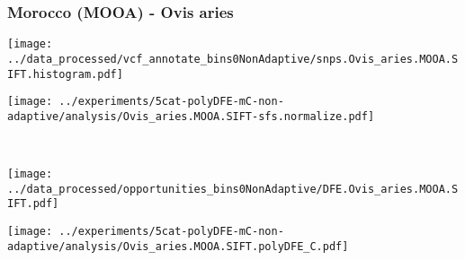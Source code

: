 \subsubsection{Morocco (MOOA) - Ovis aries}

\begin{minipage}{0.49\linewidth}
    \texttt{[image: ../data\_processed/vcf\_annotate\_bins0NonAdaptive/snps.Ovis\_aries.MOOA.SIFT.histogram.pdf]}
\end{minipage}
\begin{minipage}{0.49\linewidth}
    \texttt{[image: ../experiments/5cat-polyDFE-mC-non-adaptive/analysis/Ovis\_aries.MOOA.SIFT-sfs.normalize.pdf]}
\end{minipage}
\\
\begin{minipage}{0.49\linewidth}
    \texttt{[image: ../data\_processed/opportunities\_bins0NonAdaptive/DFE.Ovis\_aries.MOOA.SIFT.pdf]}
\end{minipage}
\begin{minipage}{0.49\linewidth}
    \texttt{[image: ../experiments/5cat-polyDFE-mC-non-adaptive/analysis/Ovis\_aries.MOOA.SIFT.polyDFE\_C.pdf]}
\end{minipage}
\\ 
